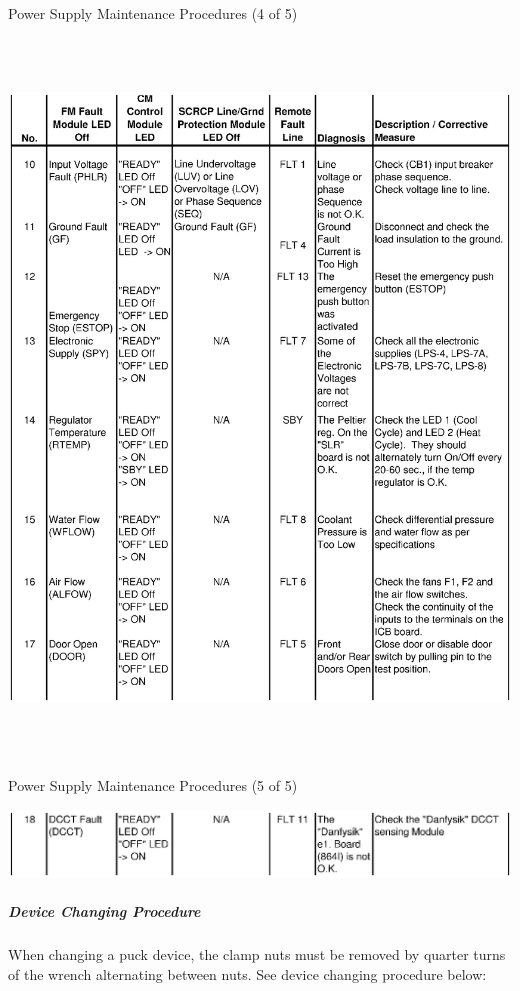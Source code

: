 \clearpage
\begin{table}
\caption{Power Supply Maintenance Procedures (4 of 5)} \label{tab:ps_maint_4}
\includegraphics[height=7.5in,width=6.2in]{book4.ps}
\end{table}

\clearpage
\begin{table}
\caption{Power Supply Maintenance Procedures (5 of 5) \label{tab:ps_maint_5}}
\includegraphics[width=6.2in]{book5.ps}
\end{table}
\clearpage


\subparagraph{Device Changing Procedure}

When changing a puck device, the clamp nuts must be removed by
quarter turns of the wrench alternating between nuts.  See device
changing procedure below:

